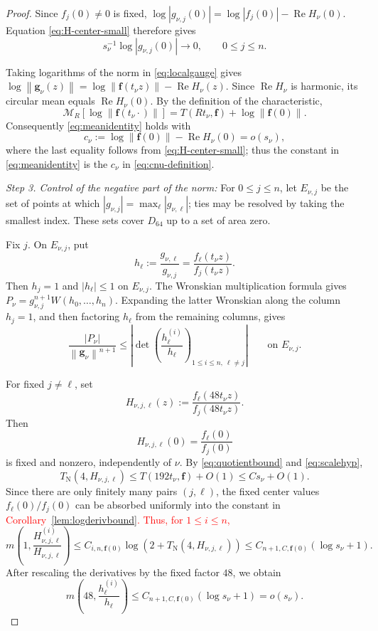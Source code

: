 \documentclass[12pt,letterpaper,reqno]{amsart}
\theoremstyle{definition}
\numberwithin{equation}{section}
\newcommand{\TN}{T_{\mathrm N}}
\newcommand{\mean}[2]{\mathcal M_{#1}\!\left[#2\right]}
\newcommand{\norm}[1]{\left\lVert#1\right\rVert}
\DeclareMathOperator{\Ree}{Re}
\newcommand{\fv}{\bm f}
\newcommand{\gv}{\bm g}
\newcommand{\revision}[1]{\textcolor{red}{#1}}
\begin{document}
\begin{proof}
Since \(f_j(0)\ne0\) is fixed,
\(\log|g_{\nu,j}(0)|
 =\log|f_j(0)|-\Ree H_\nu(0)\).
Equation \eqref{eq:H-center-small} therefore gives
\begin{equation}\label{eq:center-component-normalization}
 s_\nu^{-1}\log|g_{\nu,j}(0)|
 \longrightarrow0,
 \qquad
 0\leq j\leq n.
\end{equation}

Taking logarithms of the norm in \eqref{eq:localgauge} gives
\(\log\norm{\gv_\nu(z)}
 =\log\norm{\fv(t_\nu z)}-\Ree H_\nu(z)\).
Since \(\Ree H_\nu\) is harmonic, its circular mean equals
\(\Ree H_\nu(0)\). By the definition of the characteristic,
\[
 \mean R{\log\norm{\fv(t_\nu\cdot)}}
 =
 T(Rt_\nu,\fv)+\log\norm{\fv(0)}.
\]
Consequently \eqref{eq:meanidentity} holds with
\begin{equation}\label{eq:cnu-definition}
 c_\nu
 :=
 \log\norm{\fv(0)}-\Ree H_\nu(0)
 =
 o(s_\nu),
\end{equation}
where the last equality follows from \eqref{eq:H-center-small}; thus
the constant in \eqref{eq:meanidentity} is the \(c_\nu\) in
\eqref{eq:cnu-definition}.


\medskip\noindent
\emph{{Step 3. Control of the negative part of the norm:}}
For \(0\leq j\leq n\), let \(E_{\nu,j}\) be the set of points at
which
\(|g_{\nu,j}|=\max_\ell|g_{\nu,\ell}|\); ties may be resolved by taking
the smallest index. These sets cover \(D_{64}\) up to a set of area
zero.

Fix \(j\). On \(E_{\nu,j}\), put
\[
 h_\ell
 :=
 \frac{g_{\nu,\ell}}{g_{\nu,j}}
 =
 \frac{f_\ell(t_\nu z)}{f_j(t_\nu z)}.
\]
Then \(h_j=1\) and \(|h_\ell|\leq1\) on \(E_{\nu,j}\).
The Wronskian multiplication formula gives
\(P_\nu=g_{\nu,j}^{n+1}W(h_0,\ldots,h_{n})\).
Expanding the latter Wronskian along the column \(h_j=1\), and then
factoring \(h_\ell\) from the remaining columns, gives
\begin{equation}\label{eq:negativedeterminant}
 \frac{|P_\nu|}{\norm{\gv_\nu}^{n+1}}
 \leq
 \left|
 \det\left(
 \frac{h_\ell^{(i)}}{h_\ell}
 \right)_{
 1\leq i\leq n,\ \ell\ne j}
 \right|
 \qquad\text{on }E_{\nu,j}.
\end{equation}

For fixed \(j\ne\ell\), set
\[
 H_{\nu,j,\ell}(z)
 :=
 \frac{f_\ell(48t_\nu z)}{f_j(48t_\nu z)}.
\]
Then
\[
 H_{\nu,j,\ell}(0)=\frac{f_\ell(0)}{f_j(0)}
\]
is fixed and nonzero, independently of \(\nu\). By
\eqref{eq:quotientbound} and \eqref{eq:scalehyp},
\[
 \TN(4,H_{\nu,j,\ell})
 \leq
 T(192t_\nu,\fv)+O(1)
 \leq
 Cs_\nu+O(1).
\]
Since there are only finitely many pairs \((j,\ell)\), the fixed center
values \(f_\ell(0)/f_j(0)\) can be absorbed uniformly into the constant in
\revision{Corollary~\ref{lem:logderivbound}. Thus, for \(1\leq i\leq n\),}
\[
 m\!\left(1,
 \frac{H_{\nu,j,\ell}^{(i)}}{H_{\nu,j,\ell}}\right)
 \leq
 C_{i,n,\fv(0)}
 \log\!\left(2+\TN(4,H_{\nu,j,\ell})\right)
 \leq
 C_{n+1,C,\fv(0)}(\log s_\nu+1).
\]
After rescaling the derivatives by the fixed factor \(48\), we obtain
\begin{equation}\label{eq:ratio-logderiv-48}
 m\left(
 48,\frac{h_\ell^{(i)}}{h_\ell}
 \right)
 \leq
 C_{n+1,C,\fv(0)}(\log s_\nu+1)
 =
 o(s_\nu).
\end{equation}



\end{proof}
\end{document}
